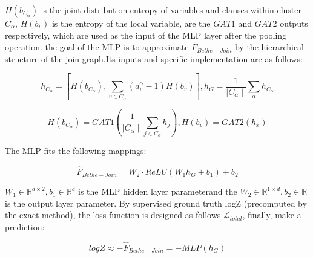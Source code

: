\(H(b_{C_\alpha})\) is the joint distribution entropy of variables and clauses within cluster \(C_\alpha\), \(H(b_v)\) is the 
entropy of the local variable, are the \(GAT1\) and \(GAT2\) outputs respectively, which are used as the input of the MLP layer 
after the pooling operation. the goal of the MLP is to approximate \(F_{Bethe-Join}\) by  the hierarchical structure of the 
join-graph.Its inputs and specific implementation are as follows:

\begin{equation}
    h_{C_\alpha}=[H(b_{C_\alpha}), \sum_{v\in C_\alpha}(d_v^\alpha-1)H(b_v)], h_G=\frac{1}{\mid{C_\alpha}\mid}\sum_\alpha h_{C_\alpha}
\end{equation}

\begin{equation}
   H(b_{C_\alpha})=GAT1(\frac{1}{ \mid C_\alpha\mid}\sum_{j\in C_\alpha}h_j), H(b_v)=GAT2(h_x)
\end{equation}

The MLP fits the following mappings:

\begin{equation}
    \hat{F}_{Bethe-Join}=W_2\cdot ReLU(W_1h_G+b_1)+b_2
\end{equation}

\( W_1\in\mathbb{R}^{d\times 2}, b_1\in \mathbb{R^d}\) is the MLP hidden layer parameterand the \(W_2\in\mathbb{R}^{1\times d} , 
b_2\in \mathbb{R}\) is the output layer parameter. By supervised ground truth logZ (precomputed by the exact method), the loss 
function is designed as follows \(\mathcal L_{total}\), finally, make a prediction:

\begin{equation}
    logZ\approx -\hat{F}_{Bethe-Join}=-MLP(h_G)
\end{equation}
